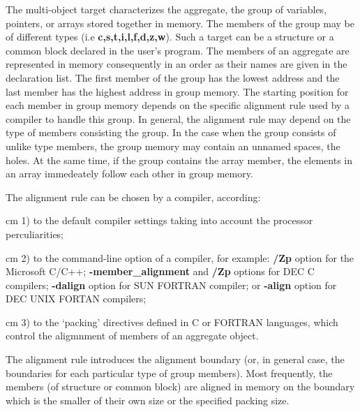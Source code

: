 The multi-object target characterizes the aggregate,
the group of variables, pointers, or arrays stored together in memory.
The members of the group may be of different types
(i.e {\bf c,s,t,i,l,f,d,z,w}). Such a target can be a structure
or a common block declared in the user's program.
The members of an aggregate are represented in memory
consequently in an order as their names are given in the
declaration list. The first member of the group
has the lowest address and the last member has the highest address 
in group memory. The starting position for each member in  group memory
depends on the specific alignment rule used by a compiler to handle
this group.  
In general, the alignment rule may depend on the type of members
consisting the group. In the case when the group consists of unlike
type members,
the group memory may contain an unnamed spaces, the holes.
At the same time, if the group contains the array member, 
the elements in an array immedeately follow each other 
in  group memory.

The alignment rule can be chosen by a compiler, according:

{
{ cm}
1) to the default compiler settings taking into account
the processor perculiarities;
}

{
{ cm}
2) to the command-line option of a compiler,
for example: {\bf /Zp} option for the Microsoft C/C++;
{\bf -member\_alignment} and {\bf /Zp} options for DEC C compilers;
{\bf -dalign} option for SUN FORTRAN compiler; or
{\bf -align} option for DEC UNIX FORTAN compilers;
}

{
{ cm}
3) to the `packing' directives defined in C or FORTRAN
languages, which control the aligmnment of members
of an aggregate object.
}

The alignment rule introduces the alignment boundary 
(or, in general case, the boundaries for each particular type
of  group members).
Most frequently, the members (of structure or common block)
are aligned in memory on the boundary which is the smaller 
of their own size or the specified packing size.
 
